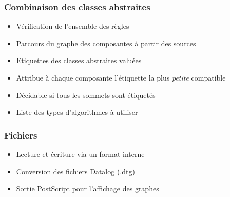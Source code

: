 \begin{frame}
	\frametitle{Combinaison des classes abstraites}
	\begin{itemize}
		\item Vérification de l'ensemble des règles
		\item Parcours du graphe des composantes à partir des sources
		\item Etiquettes des classes abstraites valuées
		\item Attribue à chaque composante l'étiquette la plus {\em petite} compatible
		\item Décidable si tous les sommets sont étiquetés
		\item Liste des types d'algorithmes à utiliser
	\end{itemize}
\end{frame}

\begin{frame}
	\frametitle{Fichiers}
	\begin{itemize}
		\item Lecture et écriture via un format interne
		\item Conversion des fichiers Datalog (.dtg)
		\item Sortie PostScript pour l'affichage des graphes
	\end{itemize}
\end{frame}

